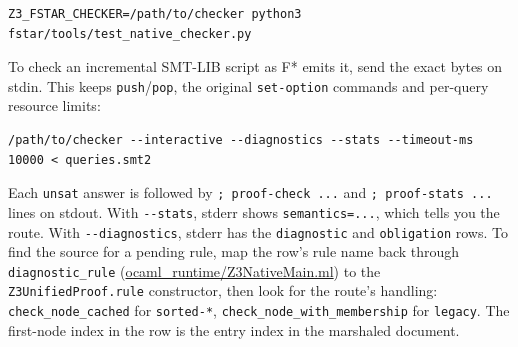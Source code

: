 \documentclass[10pt,a4paper]{article}
\begin{document}
\begin{lstlisting}[basicstyle=\ttfamily\footnotesize,breaklines=true,breakatwhitespace=false,columns=fullflexible,keepspaces=true,showstringspaces=false,breakindent=1.5em,postbreak=\mbox{\textcolor{gray}{$\hookrightarrow$}\space},frame=single,rulecolor=\color{lightgray},xleftmargin=2pt,xrightmargin=2pt,aboveskip=6pt,belowskip=6pt]
Z3_FSTAR_CHECKER=/path/to/checker python3 fstar/tools/test_native_checker.py
\end{lstlisting}

To check an incremental SMT-LIB script as F* emits it, send the exact bytes on stdin. This keeps \texttt{push}/\texttt{pop}, the original \texttt{set-{}\allowbreak{}option} commands and per-query resource limits:

\begin{lstlisting}[basicstyle=\ttfamily\footnotesize,breaklines=true,breakatwhitespace=false,columns=fullflexible,keepspaces=true,showstringspaces=false,breakindent=1.5em,postbreak=\mbox{\textcolor{gray}{$\hookrightarrow$}\space},frame=single,rulecolor=\color{lightgray},xleftmargin=2pt,xrightmargin=2pt,aboveskip=6pt,belowskip=6pt]
/path/to/checker --interactive --diagnostics --stats --timeout-ms 10000 < queries.smt2
\end{lstlisting}

Each \texttt{unsat} answer is followed by \texttt{; proof-{}\allowbreak{}check .\allowbreak{}.\allowbreak{}.\allowbreak{}} and \texttt{; proof-{}\allowbreak{}stats .\allowbreak{}.\allowbreak{}.\allowbreak{}} lines on stdout. With \texttt{-{}\allowbreak{}-{}\allowbreak{}stats}, stderr shows \texttt{semantics=\allowbreak{}.\allowbreak{}.\allowbreak{}.\allowbreak{}}, which tells you the route. With \texttt{-{}\allowbreak{}-{}\allowbreak{}diagnostics}, stderr has the \texttt{diagnostic} and \texttt{obligation} rows. To find the source for a pending rule, map the row's rule name back through \texttt{diagnostic\_\allowbreak{}rule} (\href{https://github.com/Z3Prover/z3/blob/8fbb275aba0472e862e289c7af1331b3bd5d512c/fstar/ocaml_runtime/Z3NativeMain.ml\#L7-L45}{ocaml\_\allowbreak{}runtime/\allowbreak{}Z3Native\allowbreak{}Main.\allowbreak{}ml}) to the \texttt{Z3UnifiedProof.\allowbreak{}rule} constructor, then look for the route's handling: \texttt{check\_\allowbreak{}node\_\allowbreak{}cached} for \texttt{sorted-{}\allowbreak{}*}, \texttt{check\_\allowbreak{}node\_\allowbreak{}with\_\allowbreak{}membership} for \texttt{legacy}. The first-node index in the row is the entry index in the marshaled document.
\end{document}
